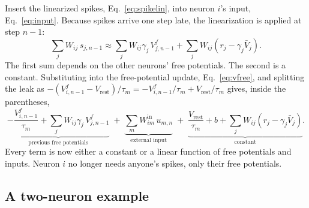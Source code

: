 \documentclass[11pt,a4paper]{article}
\newcommand{\Vrest}{V_{\mathrm{rest}}}
\begin{document}
Insert the linearized spikes, Eq.~\eqref{eq:spikelin}, into neuron $i$'s input, Eq.~\eqref{eq:input}. Because spikes arrive one step late, the linearization is applied at step $n-1$:
\begin{equation*}
\sum_j W_{ij}\, s_{j,n-1} \approx \sum_j W_{ij}\gamma_j\, V^f_{j,n-1} + \sum_j W_{ij}\left( r_j - \gamma_j \bar V_j \right).
\end{equation*}
The first sum depends on the other neurons' free potentials. The second is a constant. Substituting into the free-potential update, Eq.~\eqref{eq:vfree}, and splitting the leak as $-(V^f_{i,n-1} - \Vrest)/\tau_m = -V^f_{i,n-1}/\tau_m + \Vrest/\tau_m$ gives, inside the parentheses,
\begin{equation*}
\underbrace{-\frac{V^f_{i,n-1}}{\tau_m} + \sum_j W_{ij}\gamma_j\, V^f_{j,n-1}}_{\text{previous free potentials}}
\;+\; \underbrace{\sum_m W^{\mathrm{in}}_{im}\, u_{m,n}}_{\text{external input}}
\;+\; \underbrace{\frac{\Vrest}{\tau_m} + b + \sum_j W_{ij}\left( r_j - \gamma_j \bar V_j \right)}_{\text{constant}}.
\end{equation*}
Every term is now either a constant or a linear function of free potentials and inputs. Neuron $i$ no longer needs anyone's spikes, only their free potentials.

\subsection{A two-neuron example}
\end{document}
